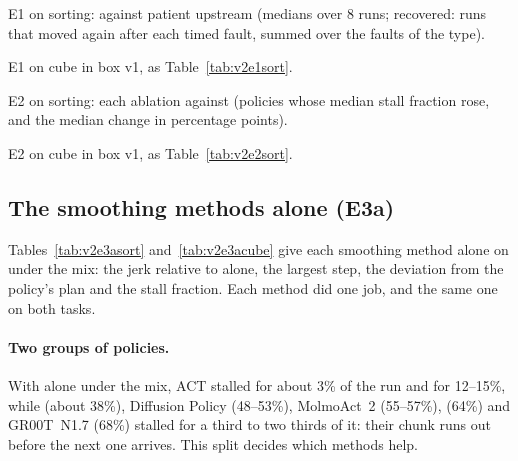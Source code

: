 \begin{table}[htbp]
  \centering
  \small
  \begin{adjustbox}{max width=\textwidth}
  \end{adjustbox}
  \caption{E1 on sorting: \drtc{} against patient upstream (medians over 8 runs; recovered: runs that moved again
           after each timed fault, summed over the faults of the type).}\label{tab:v2e1sort}
\end{table}

\begin{table}[htbp]
  \centering
  \small
  \begin{adjustbox}{max width=\textwidth}
  \end{adjustbox}
  \caption{E1 on cube in box v1, as Table~\ref{tab:v2e1sort}.}\label{tab:v2e1cube}
\end{table}

\begin{table}[htbp]
  \centering
  \small
  \caption{E2 on sorting: each ablation against \drtc{} (policies whose median stall fraction rose, and the median
           change in percentage points).}\label{tab:v2e2sort}
\end{table}

\begin{table}[htbp]
  \centering
  \small
  \caption{E2 on cube in box v1, as Table~\ref{tab:v2e2sort}.}\label{tab:v2e2cube}
\end{table}

\subsection{The smoothing methods alone (E3a)}

Tables~\ref{tab:v2e3asort} and~\ref{tab:v2e3acube} give each smoothing method alone on \drtc{} under the mix: the jerk
relative to \drtc{} alone, the largest step, the deviation from the policy's plan and the stall fraction. Each method
did one job, and the same one on both tasks.

\paragraph{Two groups of policies.} With \drtc{} alone under the mix, ACT stalled for about 3\% of the run and
\smolvla{} for 12--15\%, while \pizerofive{} (about 38\%), Diffusion Policy (48--53\%), MolmoAct~2 (55--57\%),
\groot{} (64\%) and GR00T~N1.7 (68\%) stalled for a third to two thirds of it: their chunk runs out before the next
one arrives. This split decides which methods help.

